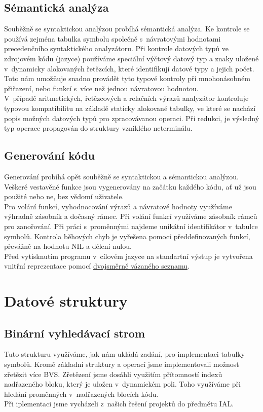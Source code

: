 \documentclass[11pt]{article}
\begin{document}
	\subsection{Sémantická analýza}
    	Souběžně se syntaktickou analýzou probíhá sémantická analýza. Ke kontrole se používá zejména tabulka symbolu společně s~návratovými hodnotami precedenčního syntaktického analyzátoru. Při kontrole datových typů ve zdrojovém kódu (jazyce) používáme speciální výčtový datový typ a znaky uložené v~dynamicky alokovaných řetězcích, které identifikují datové typy a jejich počet. Toto nám umožňuje snadno provádět tyto typové kontroly pří mnohonásobném přiřazení, nebo funkcí s~více než jednou návratovou hodnotou. \\
    	\indent V~případě aritmetických, řetězcových a relačních výrazů	 analyzátor kontroluje typovou kompatibilitu na základě staticky alokované tabulky, ve které se nachází popis možných datových typů pro zpracovávanou operaci. Při redukci, je výsledný typ operace propagován do struktury vzniklého neterminálu.
    	
        \pagebreak
        
	\subsection{Generování kódu}
	    Generování probíhá opět souběžně se syntaktickou a sémantickou analýzou. Veškeré vestavěné funkce jsou vygenerovány na začátku každého kódu, ať už jsou použité nebo ne, bez vědomí uživatele. \\
	    \indent Pro volání funkcí, vyhodnocování výrazů a návratové hodnoty využíváme výhradně zásobník a dočasný rámec. Při volání funkcí využíváme zásobník rámců pro zanořování. Při práci s~proměnnými najdeme unikátní identifikátor v~tabulce symbolů. Kontrola běhových chyb je vyřešena pomocí předdefinovaných funkcí, převážně na hodnotu NIL a dělení nulou. \\
	    \indent Před vytisknutím programu v~cílovém jazyce na standartní výstup je vytvořena vnitřní reprezentace pomocí \hyperref[sec:dll]{dvojsměrně vázaného seznamu}. 
	    
	\vspace{5mm}
    \section{Datové struktury}
    
    \subsection{Binární vyhledávací strom}
        Tuto strukturu využíváme, jak nám ukládá zadání, pro implementaci tabulky symbolů. Kromě základní struktury a operací jsme implementovali možnost zřetězit více BVS. Zřetězení jsme dosáhli využitím přítomností indexů nadřazeného bloku, který je uložen v~dynamickém poli. Toho využíváme při hledání proměnných v~nadřazených blocích kódu.\\
        Při iplementaci jsme vycházeli z~našich řešení projektů do předmětu IAL.
    
\end{document}
